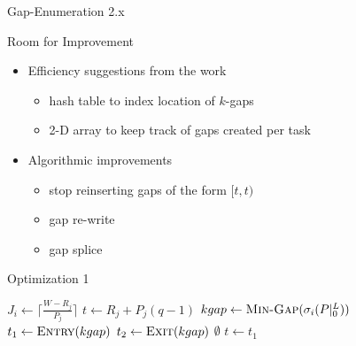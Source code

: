 \documentclass{beamer}
\begin{document}
\begin{section}{Gap-Enumeration 2.x}
\begin{frame}{Room for Improvement}
  \begin{itemize}
  \item{
    Efficiency suggestions from the work\autocite[17]{BelwalCheng}
    \begin{itemize}
    \item{hash table to index location of $k$-gaps}
    \item{2-D array to keep track of gaps created per task}
    \end{itemize}
  }
  \item{
    Algorithmic improvements
    \begin{itemize}
    \item{stop reinserting gaps of the form $[t,t)$}
    \item{gap re-write}
    \item{gap splice}
    \end{itemize}
  }
  \end{itemize}
\end{frame}
\begin{frame}{Optimization 1}
  \begin{algorithm}[H]
    \begin{multicols}{2}
    {\tiny
      \begin{algorithmic}[2]
          \State $J_{i} \gets \lceil\frac{W - R_{j}}{P_{j}}\rceil$
            \State $t \gets R_{j} + P_{j}(q-1)$
            \State $kgap \gets \Call{Min-Gap}{\sigma_{i}(P|_{0}^{L})}$
            \State $t_{1} \gets \Call{Entry}{kgap}$
            \State $t_{2} \gets \Call{Exit}{kgap}$
                \State \Return $\emptyset$
              \EndIf
                \State $t \gets t_{1}$
              \EndIf
                \State \Call{Gap-Delete}{$\sigma_{i}(P|_{0}^{L}), [t_{1},t_{2})$}
                    \State \Call{Gap-Insert}{$\sigma_{i}(P|_{0}^{L}), [t_{1},t)$}
                  \NewEndIf
                  \ExitWhile
                \EndIf
                      \State \Call{Gap-Insert}{$\sigma_{i}(P|_{0}^{L}), [t_{1},t)$}

\end{algorithmic}}
\end{multicols}
\end{algorithm}
\end{frame}
\end{section}
\end{document}
